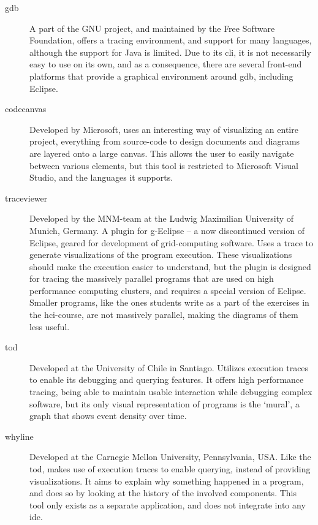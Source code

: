 \begin{description}
\item[\gls{gdb}] A part of the GNU project, and maintained by the Free Software Foundation, offers a tracing environment, and support for many languages, although the support for Java is limited.
Due to its \gls{cli}, it is not necessarily easy to use on its own, and as a consequence, there are several front-end platforms that provide a graphical environment around \gls{gdb}, including Eclipse.

\item[\Gls{codecanvas}] \cite{Deline2010} Developed by Microsoft, uses an interesting way of visualizing an entire project, everything from source-code to design documents and diagrams are layered onto a large canvas.
This allows the user to easily navigate between various elements, but this tool is restricted to Microsoft Visual Studio, and the languages it supports.

\item[\gls{traceviewer}] \cite{Thomas2010} Developed by the MNM-team at the Ludwig Maximilian University of Munich, Germany.
A plugin for g-Eclipse -- a now discontinued version of Eclipse, geared for development of grid-computing software.
Uses a trace to generate visualizations of the program execution.
These visualizations should make the execution easier to understand, but the plugin is designed for tracing the massively parallel programs that are used on high performance computing clusters, and requires a special version of Eclipse.
Smaller programs, like the ones students write as a part of the exercises in the \gls{hci}-course, are not massively parallel, making the diagrams of them less useful.

\item[\gls{tod}] \cite{Pothier2007} Developed at the University of Chile in Santiago.
Utilizes execution traces to enable its debugging and querying features.
It offers high performance tracing, being able to maintain usable interaction while debugging complex software, but its only visual representation of programs is the `mural', a graph that shows event density over time.

\item[\Gls{whyline}] \cite{ko2009} Developed at the Carnegie Mellon University, Pennsylvania, USA.
Like the \gls{tod}, makes use of execution traces to enable querying, instead of providing visualizations.
It aims to explain why something happened in a program, and does so by looking at the history of the involved components.
This tool only exists as a separate application, and does not integrate into any \gls{ide}.


\end{description}
